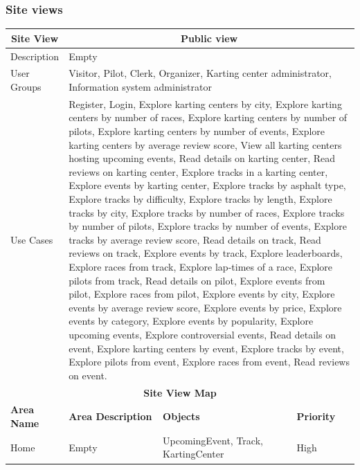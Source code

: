 \documentclass{beamer}
\begin{document}
\begin{frame}
    \frametitle{Site views}
    \begin{table}
        \centering
        \tiny
        \setlength{\tabcolsep}{1pt}
        \begin{tabular}{|m{2cm}|m{4cm}|m{3cm}|m{1cm}|}
        \hline
        \multicolumn{1}{|c|}{\textbf{Site View}} & \multicolumn{3}{c|}{\textbf{Public view}} \\ 
        \hline
        Description & \multicolumn{3}{m{8cm}|}{Empty} \\
        \hline
        User Groups & \multicolumn{3}{m{8cm}|}{Visitor, Pilot, Clerk, Organizer, 
        Karting center administrator, Information system administrator} \\
        \hline
        Use Cases & \multicolumn{3}{m{8cm}|}{Register, Login, Explore karting centers by city, 
        Explore karting centers by number of races, Explore karting centers by number of pilots, 
        Explore karting centers by number of events, Explore karting centers by average review score, 
        View all karting centers hosting upcoming events, Read details on karting center, 
        Read reviews on karting center, Explore tracks in a karting center, Explore events by karting center, 
        Explore tracks by asphalt type, Explore tracks by difficulty, Explore tracks by length, 
        Explore tracks by city, Explore tracks by number of races, Explore tracks by number of pilots, 
        Explore tracks by number of events, Explore tracks by average review score, Read details on track, 
        Read reviews on track, Explore events by track, Explore leaderboards, Explore races from track, 
        Explore lap-times of a race, Explore pilots from track, Read details on pilot, Explore events from pilot, 
        Explore races from pilot, Explore events by city, Explore events by average review score, 
        Explore events by price, Explore events by category, Explore events by popularity, 
        Explore upcoming events, Explore controversial events, Read details on event, 
        Explore karting centers by event, Explore tracks by event, Explore pilots from event, 
        Explore races from event, Read reviews on event.
        } \\
        \hline
        \multicolumn{4}{|c|}{\textbf{Site View Map}} \\
        \hline
        \textbf{Area Name} & \textbf{Area Description} & \textbf{Objects} & \textbf{Priority} \\
        \hline
        Home & Empty & UpcomingEvent, Track, KartingCenter & High \\
        \hline
        \end{tabular}
    \end{table}
\end{frame}
\end{document}
